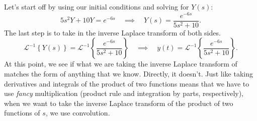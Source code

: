 \documentclass[a4paper,12pt]{article} %
\begin{document}
Let's start off by using our initial conditions and solving for $Y(s)$:
$$ 5s^2Y + 10Y = e^{-6s} \quad\implies\quad Y(s) = \frac{e^{-6s}}{5s^2 + 10}. $$
The last step is to take in the inverse Laplace transform of both sides.
$$ \mathcal{L}^{-1}\left\{Y(s)\right\} = \mathcal{L}^{-1}\left\{\frac{e^{-6s}}{5s^2 + 10}\right\} \quad\implies\quad y(t) = \mathcal{L}^{-1}\left\{\frac{e^{-6s}}{5s^2 + 10}\right\}. $$
At this point, we see if what we are taking the inverse Laplace transform of matches the form of anything that we know. Directly, it doesn't. Just like taking derivatives and integrals of the product of two functions means that we have to use \textit{fancy} multiplication (product rule and integration by parts, respectively), when we want to take the inverse Laplace transform of the product of two functions of $s$, we use convolution.\\
\end{document}
